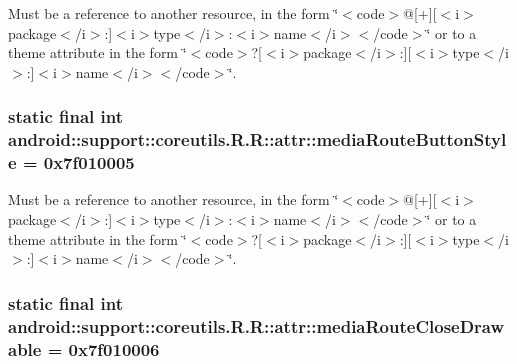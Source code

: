 Must be a reference to another resource, in the form \char`\"{}$<$code$>$@\mbox{[}+\mbox{]}\mbox{[}$<$i$>$package$<$/i$>$:\mbox{]}$<$i$>$type$<$/i$>$:$<$i$>$name$<$/i$>$$<$/code$>$\char`\"{} or to a theme attribute in the form \char`\"{}$<$code$>$?\mbox{[}$<$i$>$package$<$/i$>$:\mbox{]}\mbox{[}$<$i$>$type$<$/i$>$:\mbox{]}$<$i$>$name$<$/i$>$$<$/code$>$\char`\"{}. \hypertarget{classandroid_1_1support_1_1coreutils_1_1_r_1_1attr_6963f220029749f831d68210e6b22774}{
\subsubsection[{mediaRouteButtonStyle}]{\setlength{\rightskip}{0pt plus 5cm}static final int android::support::coreutils.R.R::attr::mediaRouteButtonStyle = 0x7f010005}}
\label{classandroid_1_1support_1_1coreutils_1_1_r_1_1attr_6963f220029749f831d68210e6b22774}


Must be a reference to another resource, in the form \char`\"{}$<$code$>$@\mbox{[}+\mbox{]}\mbox{[}$<$i$>$package$<$/i$>$:\mbox{]}$<$i$>$type$<$/i$>$:$<$i$>$name$<$/i$>$$<$/code$>$\char`\"{} or to a theme attribute in the form \char`\"{}$<$code$>$?\mbox{[}$<$i$>$package$<$/i$>$:\mbox{]}\mbox{[}$<$i$>$type$<$/i$>$:\mbox{]}$<$i$>$name$<$/i$>$$<$/code$>$\char`\"{}. \hypertarget{classandroid_1_1support_1_1coreutils_1_1_r_1_1attr_19fced5a577f8ca8ae355f778c26f4e8}{
\subsubsection[{mediaRouteCloseDrawable}]{\setlength{\rightskip}{0pt plus 5cm}static final int android::support::coreutils.R.R::attr::mediaRouteCloseDrawable = 0x7f010006}}
\label{classandroid_1_1support_1_1coreutils_1_1_r_1_1attr_19fced5a577f8ca8ae355f778c26f4e8}


